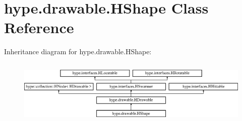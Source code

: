 \hypertarget{classhype_1_1drawable_1_1_h_shape}{\section{hype.\-drawable.\-H\-Shape Class Reference}
\label{classhype_1_1drawable_1_1_h_shape}
}
Inheritance diagram for hype.\-drawable.\-H\-Shape\-:\begin{figure}[H]
\begin{center}
\leavevmode
\includegraphics[height=3.111111cm]{classhype_1_1drawable_1_1_h_shape}
\end{center}
\end{figure}
